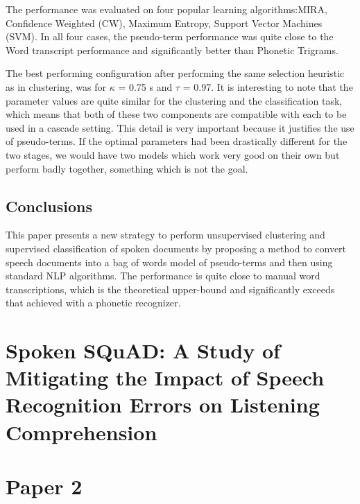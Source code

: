 \documentclass[a4paper]{article}
\begin{document}
The performance was evaluated on four popular learning algorithms:MIRA, Confidence Weighted (CW), Maximum Entropy, Support Vector Machines (SVM). In all four cases, the pseudo-term performance was quite close to the Word transcript performance and significantly better than Phonetic Trigrams.

The best performing configuration after performing the same selection heuristic as in clustering, was for $\kappa$ = 0.75 s and $\tau$ = 0.97. It is interesting to note that the parameter values are quite similar for the clustering and the classification task, which means that both of these two components are compatible with each to be used in a cascade setting. This detail is very important because it justifies the use of pseudo-terms. If the optimal parameters had been drastically different for the two stages, we would have two models which work very good on their own but perform badly together, something which is not the goal.


\subsection{Conclusions}
This paper presents a new strategy to perform unsupervised clustering and supervised classification of spoken documents by proposing a method to convert speech documents into a bag of words model of pseudo-terms and then using standard NLP algorithms. The performance is quite close to manual word transcriptions, which is the theoretical upper-bound and significantly exceeds that achieved with a phonetic recognizer.

\section{Spoken SQuAD: A Study of Mitigating the Impact of Speech Recognition Errors on Listening Comprehension}
\subsection{}

\section{Paper 2}
\end{document}
